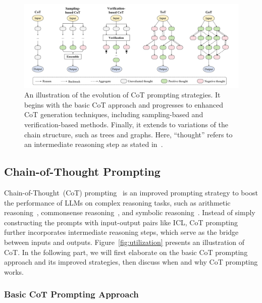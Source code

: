 \begin{figure}[t]
    \centering
    \includegraphics[width=\textwidth]{images/XoT.pdf}
    \caption{
        An illustration of the evolution of CoT prompting strategies. It begins with the basic CoT approach and progresses to enhanced CoT generation techniques,  including sampling-based and verification-based methods. Finally, it extends to variations of the chain structure, such as trees and graphs. Here, ``thought'' refers to an intermediate reasoning step as stated in~\cite{Wei-arxiv-2022-chain, Yao-arxiv-2023-Tree}.
    }
\label{fig:extension_of_CoT}
\end{figure}

\subsection{Chain-of-Thought Prompting}
\label{subsec-cot}

Chain-of-Thought~(CoT) prompting~\cite{Wei-arxiv-2022-chain, Chu-arxiv-2023-A} is an improved prompting strategy to boost the performance of LLMs on complex reasoning tasks, such as arithmetic reasoning~\cite{Miao-ACL-2020-A}, commonsense reasoning~\cite{Talmor-naacl-2019-CommonsenseQA}, and symbolic reasoning~\cite{Wei-arxiv-2022-chain}.
Instead of simply constructing the prompts with input-output pairs like ICL, CoT prompting further incorporates intermediate reasoning steps, which serve as the bridge between inputs and outputs.
{
Figure~\ref{fig:utilization} presents an illustration of CoT.
In the following part, we will first elaborate on the basic CoT prompting approach and its improved strategies, then discuss when and why CoT prompting works.
}

\subsubsection{Basic CoT Prompting Approach}


{
}

